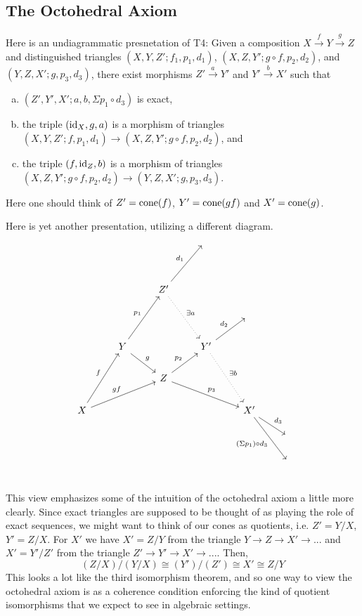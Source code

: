 \documentclass[11pt]{article}
\begin{document}
\subsection{The Octohedral Axiom}\label{octaxiom}
Here is an undiagrammatic presnetation of T4: Given a composition $X \xrightarrow{f} Y \xrightarrow{g} Z$ and distinguished triangles $(X,Y,Z'; f_1, p_1, d_1)$, $(X,Z,Y'; g\circ f, p_2, d_2)$, and $(Y,Z,X'; g, p_3, d_3)$, there exist morphisms $Z' \xrightarrow{a} Y'$ and $Y' \xrightarrow{b} X'$ such that
	\begin{enumerate}[(a)]
		\item $(Z',Y',X'; a,b,\Sigma p_1 \circ d_3)$ is exact,
		\item the triple $(\operatorname{id}_X,g,a)$ is a morphism of triangles $(X,Y,Z'; f,p_1,d_1) \to (X,Z,Y'; g\circ f,p_2,d_2)$, and
		\item the triple $(f,\operatorname{id}_Z,b)$ is a morphism of triangles $(X,Z,Y'; g\circ f, p_2, d_2) \to (Y,Z,X'; g, p_3, d_3)$.
	\end{enumerate}
	Here one should think of $Z' = \operatorname{cone}(f)$, $Y' = \operatorname{cone}(gf)$ and $X' = \operatorname{cone}(g)$.

Here is yet another presentation, utilizing a different diagram. 
\[\begin{tikzcd}
  &   &   & {} & &  \\
  &   &   &   &   &  \\
  &   & Z' \ar[ruu,"d_1"]\ar[ddr,"\exists a",dotted] &   &  &  \\
  &   &   &   & {}  &  \\
  & Y\ar[rd,"g"] \ar[ruu,"p_1"] &   & Y'\ar[ru,"d_2"] \ar[rdd,"\exists b", dotted]&   &  \\
  &   & Z \ar[ru,"p_2"] \ar[drr,"p_3"] &   &   &  \\
X \ar[ruu,"f"]  \ar[urr,"gf"]&   &   &   & X' \ar[rd,"d_3"] \ar[rdd,"(\Sigma p_1) \circ d_3"'] &  \\
  &   &   &   &   & {} \\
  &   &   &   &   & {} \\
\end{tikzcd}\]
This view emphasizes some of the intuition of the octohedral axiom a little more clearly. Since exact triangles are supposed to be thought of as playing the role of exact sequences, we might want to think of our cones as quotients, i.e. $Z' = Y/X$, $Y' = Z/X$. For $X'$ we have $X' = Z/Y$ from the triangle $Y \to Z \to X' \to ... $ and $X' = Y'/Z'$ from the triangle $Z' \to Y' \to X' \to ...$. Then, 
\[
	(Z/X)/(Y/X) \cong (Y')/(Z') \cong X' \cong Z/Y
\]
This looks a lot like the third isomorphism theorem, and so one way to view the octohedral axiom is as a coherence condition enforcing the kind of quotient isomorphisms that we expect to see in algebraic settings.
\end{document}
